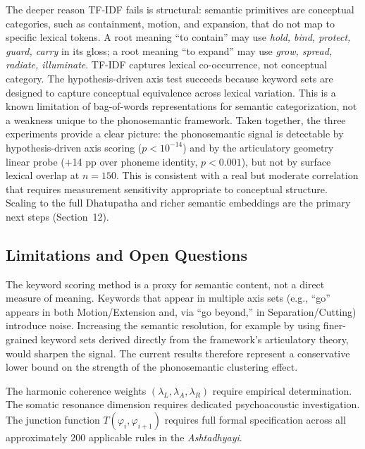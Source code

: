 \documentclass[12pt]{article}
\begin{document}
The deeper reason TF-IDF fails is structural: semantic primitives are conceptual categories, such as containment, motion, and expansion, that do not map to specific lexical tokens. A root meaning ``to contain'' may use \textit{hold, bind, protect, guard, carry} in its gloss; a root meaning ``to expand'' may use \textit{grow, spread, radiate, illuminate}. TF-IDF captures lexical co-occurrence, not conceptual category. The hypothesis-driven axis test succeeds because keyword sets are designed to capture conceptual equivalence across lexical variation. This is a known limitation of bag-of-words representations for semantic categorization, not a weakness unique to the phonosemantic framework. Taken together, the three experiments provide a clear picture: the phonosemantic signal is detectable by hypothesis-driven axis scoring ($p < 10^{-14}$) and by the articulatory geometry linear probe ($+$14 pp over phoneme identity, $p < 0.001$), but not by surface lexical overlap at $n=150$. This is consistent with a real but moderate correlation that requires measurement sensitivity appropriate to conceptual structure. Scaling to the full Dhatupatha and richer semantic embeddings are the primary next steps (Section~12).

\subsection{Limitations and Open Questions}

The keyword scoring method is a proxy for semantic content, not a direct measure of meaning. Keywords that appear in multiple axis sets (e.g., ``go'' appears in both Motion/Extension and, via ``go beyond,'' in Separation/Cutting) introduce noise. Increasing the semantic resolution, for example by using finer-grained keyword sets derived directly from the framework's articulatory theory, would sharpen the signal. The current results therefore represent a conservative lower bound on the strength of the phonosemantic clustering effect.

The harmonic coherence weights $(\lambda_L, \lambda_A, \lambda_R)$ require empirical determination. The somatic resonance dimension requires dedicated psychoacoustic investigation. The junction function $T(\varphi_i, \varphi_{i+1})$ requires full formal specification across all approximately 200 applicable rules in the \textit{Ashtadhyayi}.
\end{document}
